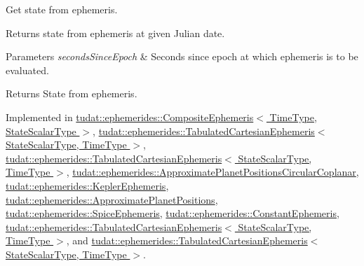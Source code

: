 Get state from ephemeris. 

Returns state from ephemeris at given Julian date. 
\begin{DoxyParams}{Parameters}
{\em seconds\+Since\+Epoch} & Seconds since epoch at which ephemeris is to be evaluated. \\
\hline
\end{DoxyParams}
\begin{DoxyReturn}{Returns}
State from ephemeris. 
\end{DoxyReturn}


Implemented in \hyperlink{classtudat_1_1ephemerides_1_1CompositeEphemeris_adaf00c6374bab84ecfa0a9f7e92d5f36}{tudat\+::ephemerides\+::\+Composite\+Ephemeris$<$ Time\+Type, State\+Scalar\+Type $>$}, \hyperlink{classtudat_1_1ephemerides_1_1TabulatedCartesianEphemeris_a5ff805936be5cbac09509772948d9765}{tudat\+::ephemerides\+::\+Tabulated\+Cartesian\+Ephemeris$<$ State\+Scalar\+Type, Time\+Type $>$}, \hyperlink{classtudat_1_1ephemerides_1_1TabulatedCartesianEphemeris_aec6aafbcce0b0fc6f4b13e4559bb96ce}{tudat\+::ephemerides\+::\+Tabulated\+Cartesian\+Ephemeris$<$ State\+Scalar\+Type, Time\+Type $>$}, \hyperlink{classtudat_1_1ephemerides_1_1ApproximatePlanetPositionsCircularCoplanar_a72e87b71ccd875c6a349c1a9a0bcb544}{tudat\+::ephemerides\+::\+Approximate\+Planet\+Positions\+Circular\+Coplanar}, \hyperlink{classtudat_1_1ephemerides_1_1KeplerEphemeris_a75c1764cd02061e2de18b09202e479e5}{tudat\+::ephemerides\+::\+Kepler\+Ephemeris}, \hyperlink{classtudat_1_1ephemerides_1_1ApproximatePlanetPositions_a76a58a0bc977fb72020cda1837be1ddf}{tudat\+::ephemerides\+::\+Approximate\+Planet\+Positions}, \hyperlink{classtudat_1_1ephemerides_1_1SpiceEphemeris_aef29e7e00cb70ad756d6c329f1edc712}{tudat\+::ephemerides\+::\+Spice\+Ephemeris}, \hyperlink{classtudat_1_1ephemerides_1_1ConstantEphemeris_ae7f535c4585ecf1d7a20fa0aedfbc91f}{tudat\+::ephemerides\+::\+Constant\+Ephemeris}, \hyperlink{classtudat_1_1ephemerides_1_1TabulatedCartesianEphemeris_a7a24cf887cd69499572de80a5be9b57d}{tudat\+::ephemerides\+::\+Tabulated\+Cartesian\+Ephemeris$<$ State\+Scalar\+Type, Time\+Type $>$}, and \hyperlink{classtudat_1_1ephemerides_1_1TabulatedCartesianEphemeris_a73d4e6226a2fe278f84dc9889fad0d81}{tudat\+::ephemerides\+::\+Tabulated\+Cartesian\+Ephemeris$<$ State\+Scalar\+Type, Time\+Type $>$}.

